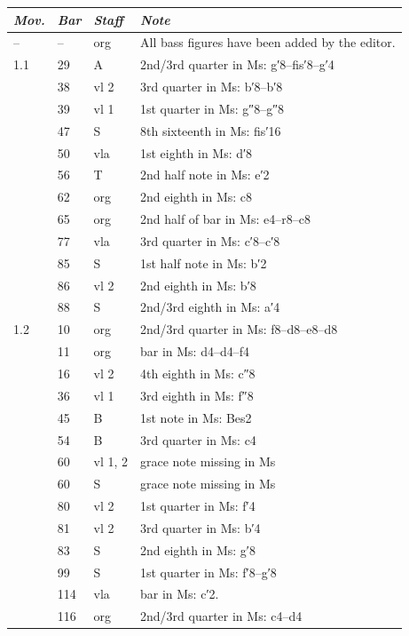 \documentclass[parskip=full]{scrreprt}
\begin{document}
\bigskip

\begin{longtable}{lll L{10cm}}
	\toprule
	\itshape Mov. & \itshape Bar & \itshape Staff & \itshape Note \\
	\midrule \endhead
	–   & –   & org   & All bass figures have been added by the editor. \\
	1.1 & 29  & A     & 2nd/3rd quarter in Ms: g′8–fis′8–g′4 \\
	    & 38  & vl 2  & 3rd quarter in Ms: b′8–b′8 \\
	    & 39  & vl 1  & 1st quarter in Ms: g″8–g″8 \\
	    & 47  & S     & 8th sixteenth in Ms: fis′16 \\
	    & 50  & vla   & 1st eighth in Ms: d′8 \\
	    & 56  & T     & 2nd half note in Ms: e′2 \\
	    & 62  & org   & 2nd eighth in Ms: c8 \\
	    & 65  & org   & 2nd half of bar in Ms: e4–r8–c8 \\
	    & 77  & vla   & 3rd quarter in Ms: c′8–c′8 \\
	    & 85  & S     & 1st half note in Ms: b′2 \\
	    & 86  & vl 2  & 2nd eighth in Ms: b′8 \\
	    & 88  & S     & 2nd/3rd eighth in Ms: a′4 \\
	1.2 & 10  & org   & 2nd/3rd quarter in Ms: f8–d8–e8–d8 \\
	    & 11  & org   & bar in Ms: d4–d4–f4 \\
	    & 16  & vl 2  & 4th eighth in Ms: c″8 \\
	    & 36  & vl 1  & 3rd eighth in Ms: f″8 \\
	    & 45  & B     & 1st note in Ms: Bes2 \\
	    & 54  & B     & 3rd quarter in Ms: c4 \\
	    & 60  & vl 1, 2 & grace note missing in Ms \\
	    & 60  & S     & grace note missing in Ms \\
	    & 80  & vl 2  & 1st quarter in Ms: f′4 \\
	    & 81  & vl 2  & 3rd quarter in Ms: b′4 \\
	    & 83  & S     & 2nd eighth in Ms: g′8 \\
	    & 99  & S     & 1st quarter in Ms: f′8–g′8 \\
	    & 114 & vla   & bar in Ms: c′2. \\
	    & 116 & org   & 2nd/3rd quarter in Ms: c4–d4 \\

\end{longtable}
\end{document}
